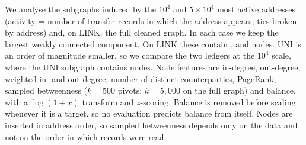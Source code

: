 We analyse the subgraphs induced by the $10^{4}$ and $5\times10^{4}$ most
active addresses (activity = number of transfer records in which the address
appears; ties broken by address) and, on LINK, the full cleaned graph. In
each case we keep the largest weakly connected component. On LINK these
contain ,  and  nodes.
UNI is an order of magnitude smaller, so we compare the two ledgers at the
$10^{4}$ scale, where the UNI subgraph contains  nodes. Node features
are in-degree, out-degree, weighted in- and out-degree, number of distinct
counterparties, PageRank, sampled betweenness \cite{brandes2001faster} ($k = 500$ pivots;
$k = 5{,}000$ on the full graph) and balance, with a $\log(1+x)$ transform and
$z$-scoring. Balance is removed before scaling whenever it is a target, so no
evaluation predicts balance from itself. Nodes are inserted in address order,
so sampled betweenness depends only on the data and not on the order in which
records were read.
